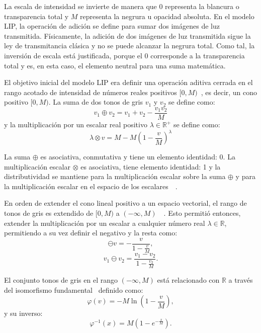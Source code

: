 La escala de intensidad se invierte de manera que 0 representa la blancura o transparencia total y $M$ representa la negrura u opacidad absoluta. En el modelo LIP, la operación de adición se define para sumar dos imágenes de luz transmitida. Físicamente, la adición de dos imágenes de luz transmitida sigue la ley de transmitancia clásica y no se puede alcanzar la negrura total. Como tal, la inversión de escala está justificada, porque el 0 corresponde a la transparencia total y es, en esta caso, el elemento neutral para una suma matemática.

El objetivo inicial del modelo LIP era definir una operación aditiva cerrada en el rango acotado de intensidad de números reales positivos $[0, M)$~\cite{jourlin1988model}, es decir, un cono positivo $[0, M )$. La suma de dos tonos de gris $v_1$ y $v_2$ se define como:
\begin{equation}
	v_1\oplus v_2=v_1+v_2-\frac{v_1v_2}{M}
\end{equation}
y la multiplicación por un escalar real positivo $\lambda \in \mathbb{R}^+$ se define como:
\begin{equation}
	\lambda \otimes v = M - M\left(1-\frac{v}{M}\right)^\lambda
\end{equation}

La suma $\oplus$ es asociativa, conmutativa y tiene un elemento identidad: 0. La multiplicaci\'on escalar $\otimes$ es asociativa, tiene elemento identidad: 1 y la distributividad se mantiene para la multiplicación escalar sobre la suma $\oplus$ y para la multiplicación escalar en el espacio de los escalares~\cite{jourlin1988model}~\cite{jourlin2016logarithmic}.

En orden de extender el cono lineal positivo a un espacio vectorial, el rango de tonos de gris es extendido de $[0,M)$ a $(-\infty,M)$~\cite{jourlin1988model}~\cite{jourlin2016logarithmic}. Esto permiti\'o entonces, extender la multiplicaci\'on por un escalar a cualquier n\'umero real $\lambda \in \mathbb{R}$, permitiendo a su vez definir el negativo y la resta como:
\begin{equation}
	\ominus v=-\frac{v}{1-\frac{v}{M}},
\end{equation}
\begin{equation}
	v_1 \ominus v_2 = \frac{v_1-v_2}{1-\frac{v_2}{M}}.
\end{equation}

El conjunto tonos de gris en el rango $(-\infty, M)$ está relacionado con $\mathbb{R}$ a través del isomorfismo fundamental~\cite{jourlin2016logarithmic} definido como:
\begin{equation}
	\varphi(v) = -M\ln\left(1-\frac{v}{M}\right),
\end{equation}
y su inverso:
\begin{equation}
	\varphi^{-1} (x) = M\left(1-e^{-\frac{x}{M}}\right).
\end{equation}

